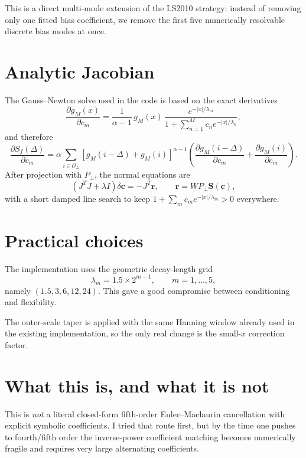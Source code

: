\documentclass[11pt]{article}
\begin{document}
This is a direct multi-mode extension of the LS2010 strategy:
instead of removing only one fitted bias coefficient, we remove the first five
numerically resolvable discrete bias modes at once.

\section{Analytic Jacobian}

The Gauss--Newton solve used in the code is based on the exact derivatives
\begin{equation}
\frac{\partial g_M(x)}{\partial c_m}
=
\frac{1}{\alpha-1}\,
g_M(x)\,
\frac{e^{-|x|/\lambda_m}}
     {1+\sum_{n=1}^{M} c_n e^{-|x|/\lambda_n}},
\end{equation}
and therefore
\begin{equation}
\frac{\partial S_f(\Delta)}{\partial c_m}
=
\alpha
\sum_{i\in \mathcal O_L}
\left[g_M(i-\Delta)+g_M(i)\right]^{\alpha-1}
\left(
\frac{\partial g_M(i-\Delta)}{\partial c_m}
+
\frac{\partial g_M(i)}{\partial c_m}
\right).
\end{equation}
After projection with \(P_\perp\), the normal equations are
\begin{equation}
\left(J^T J + \lambda I\right)\delta \bm c
=
- J^T \bm r,
\qquad
\bm r = W P_\perp \bm S(\bm c),
\end{equation}
with a short damped line search to keep
\(
1+\sum_m c_m e^{-|x|/\lambda_m}>0
\)
everywhere.

\section{Practical choices}

The implementation uses the geometric decay-length grid
\begin{equation}
\lambda_m = 1.5 \times 2^{m-1},
\qquad m=1,\dots,5,
\end{equation}
namely
\(
(1.5,3,6,12,24)
\).
This gave a good compromise between conditioning and flexibility.

The outer-scale taper is applied with the same Hanning window already used in the
existing implementation, so the only real change is the small-$x$ correction
factor.

\section{What this is, and what it is not}

This is \emph{not} a literal closed-form fifth-order Euler--Maclaurin cancellation
with explicit symbolic coefficients.  I tried that route first, but by the time one
pushes to fourth/fifth order the inverse-power coefficient matching becomes
numerically fragile and requires very large alternating coefficients.
\end{document}
